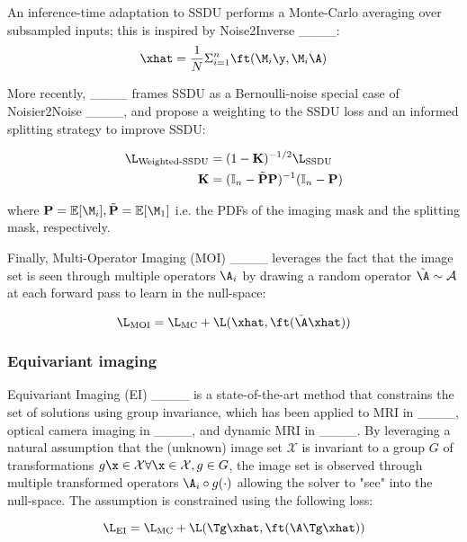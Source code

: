 An inference-time adaptation to SSDU performs a Monte-Carlo averaging over subsampled inputs; this is inspired by Noise2Inverse ____:
\begin{equation}
    \xhat=\frac{1}{N}\Sigma_{i=1}^n \ft(\M_i\y,\M_i\A)
    \label{eq:n2i}
\end{equation}

More recently, ____ frames SSDU as a Bernoulli-noise special case of Noisier2Noise ____, and propose a weighting to the SSDU loss and an informed splitting strategy to improve SSDU:

\begin{align}
    \L_\text{Weighted-SSDU}&=(1-\mathbf{K})^{-1/2}\L_\text{SSDU} \\
    \mathbf{K}&=(\mathbb{I}_n-\tilde{\mathbf{P}}\mathbf{P})^{-1}(\mathbb{I}_n-\mathbf{P})
\label{eq:millard}
\end{align}

where $\mathbf{P}=\mathbb{E}[\M_i],\tilde{\mathbf{P}}=\mathbb{E}[\M_1]$ i.e. the PDFs of the imaging mask and the splitting mask, respectively.

Finally, Multi-Operator Imaging (MOI) ____ leverages the fact that the image set is seen through multiple operators $\A_i$ by drawing a random operator $\tilde\A\sim\mathcal{A}$ at each forward pass to learn in the null-space:

\begin{equation}
    \L_\text{MOI}=\L_\text{MC}+\L(\xhat,\ft(\tilde\A\xhat))
    \label{eq:moi}
\end{equation}

\subsubsection{Equivariant imaging}
Equivariant Imaging (EI) ____ is a state-of-the-art method that constrains the set of solutions using group invariance, which has been applied to MRI in ____, optical camera imaging in ____, and dynamic MRI in ____. By leveraging a natural assumption that the (unknown) image set $\mathcal{X}$ is invariant to a group $G$ of transformations $g\x\in\mathcal{X}\forall\x\in\mathcal{X},g\in G$, the image set is observed through multiple transformed operators $\A_i\circ g(\cdot)$ allowing the solver to "see" into the null-space. The assumption is constrained using the following loss:

\begin{equation}
    \L_\text{EI}=\L_\text{MC}+\L(\Tg\xhat,\ft(\A\Tg\xhat))
    \label{eq:ei}
\end{equation}

